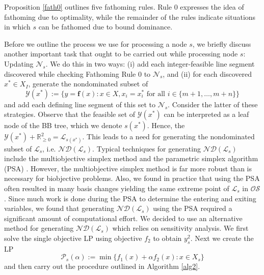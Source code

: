 \documentclass[11.5pt]{article}
\newcommand{\R}{\mathbb{R}}
\renewcommand{\L}{\mathcal{L}}
\newcommand{\N}{\mathcal{N}}
\newcommand{\OS}{\mathcal{OS}}
\newcommand{\objf}{\boldsymbol{f}}
\newcommand{\nonneg}{\R^{2}_{\ge 0}}
\newcommand{\nd}[1]{\mathcal{ND}(#1)}
\begin{document}
Proposition \ref{fath0} outlines five fathoming rules. Rule 0 expresses the idea of fathoming due to optimality, while the remainder of the rules indicate situations in which $s$ can be fathomed due to bound dominance.

Before we outline the process we use for processing a node $s$, we briefly discuss another important task that ought to be carried out while processing node $s$: Updating $\N_s$. We do this in two ways: (i) add each integer-feasible line segment discovered while checking Fathoming Rule 0 to $\N_s$, and (ii) for each discovered $x^* \in X_I$, generate the nondominated subset of 
\begin{equation}
\mathcal{Y}(x^*) := \{y = \objf(x): x \in X, x_i = x^*_i \text{ for all } i \in \{m+1,\dots, m+n\}\}
\end{equation}
and add each defining line segment of this set to $\N_s$. Consider the latter of these strategies. Observe that the feasible set of $\mathcal{Y}(x^*)$ can be interpreted as a leaf node of the BB tree, which we denote $s(x^*)$. Hence, the $\mathcal{Y}(x^*) + \nonneg = \L_{s(x^*)}$. This leads to a need for generating the nondominated subset of $\L_{s}$, i.e. $\nd{\L_s}$. Typical techniques for generating $\nd{\L_{s}}$ include the multiobjective simplex method and the parametric simplex algorithm (PSA) \citep{ehrgott2005multicriteria}. However, the multiobjective simplex method is far more robust than is necessary for biobjective problems. Also, we found in practice that using the PSA often resulted in many basis changes yielding the same extreme point of $\L_s$ in $\OS$. Since much work is done during the PSA to determine the entering and exiting variables, we found that generating $\nd{\L_s}$ using the PSA required a significant amount of computational effort. We decided to use an alternative method for generating $\nd{\L_s}$ which relies on sensitivity analysis. We first solve the single objective LP using objective $f_2$ to obtain $y^2_s$. Next we create the LP 
\begin{equation}
\mathscr{P}_s(\alpha):=\min\{ f_1(x) + \alpha f_2(x): x \in X_s\}
\end{equation}
and then carry out the procedure outlined in Algorithm \ref{alg2}.
\end{document}
